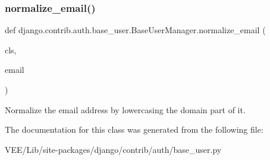 \subsubsection{\texorpdfstring{normalize\+\_\+email()}{normalize\_email()}}
{\footnotesize\ttfamily def django.\+contrib.\+auth.\+base\+\_\+user.\+Base\+User\+Manager.\+normalize\+\_\+email (\begin{DoxyParamCaption}\item[{}]{cls,  }\item[{}]{email }\end{DoxyParamCaption})}

\begin{DoxyVerb}Normalize the email address by lowercasing the domain part of it.
\end{DoxyVerb}
 

The documentation for this class was generated from the following file\+:\begin{DoxyCompactItemize}
\item 
V\+E\+E/\+Lib/site-\/packages/django/contrib/auth/base\+\_\+user.\+py\end{DoxyCompactItemize}
